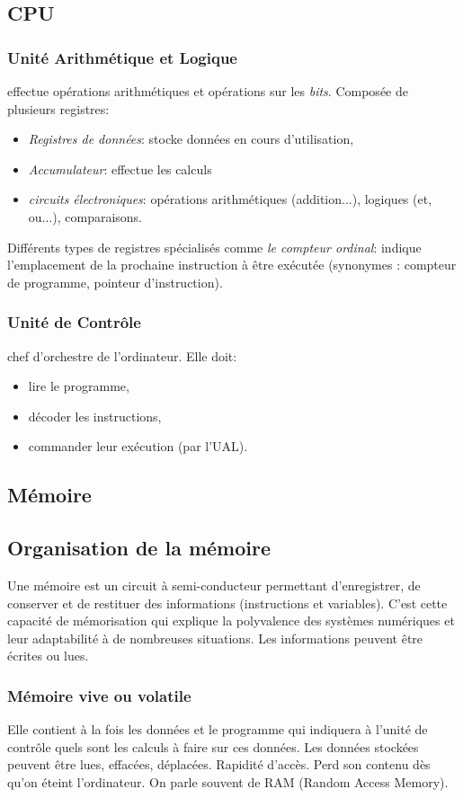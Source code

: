 \documentclass[a4paper,11pt]{article}
\begin{document}
\begin{Form}
\subsection{CPU}
\subsubsection{Unité Arithmétique et Logique}
effectue opérations arithmétiques et opérations sur les \emph{bits}. Composée de plusieurs registres:
\begin{itemize}
\item \emph{Registres de données}: stocke données en cours d'utilisation,
\item \emph{Accumulateur}: effectue les calculs
\item \emph{circuits électroniques}: opérations arithmétiques (addition...), logiques (et, ou...), comparaisons.
\end{itemize}
Différents types de registres spécialisés comme \emph{le compteur ordinal}: indique l'emplacement de la prochaine instruction à être exécutée (synonymes : compteur de programme, pointeur d'instruction).
\subsubsection{Unité de Contrôle}
chef d'orchestre de l'ordinateur. Elle doit:
\begin{itemize}
\item lire le programme,
\item décoder les instructions,
\item commander leur exécution (par l'UAL).
\end{itemize} 
\subsection{Mémoire}
\subsection{Organisation de la mémoire}
Une mémoire est un circuit à semi-conducteur permettant d’enregistrer, de conserver et de restituer des
informations (instructions et variables). C’est cette capacité de mémorisation qui explique la polyvalence
des systèmes numériques et leur adaptabilité à de nombreuses situations. Les informations peuvent être
écrites ou lues.
\subsubsection{Mémoire vive ou volatile}
Elle contient à la fois les données et le programme qui indiquera à l’unité de contrôle quels sont les calculs à faire sur ces données. Les données stockées peuvent être lues, effacées, déplacées. Rapidité d'accès. Perd son contenu dès qu'on éteint l'ordinateur. On parle souvent de RAM (Random Access Memory).

\end{Form}
\end{document}
